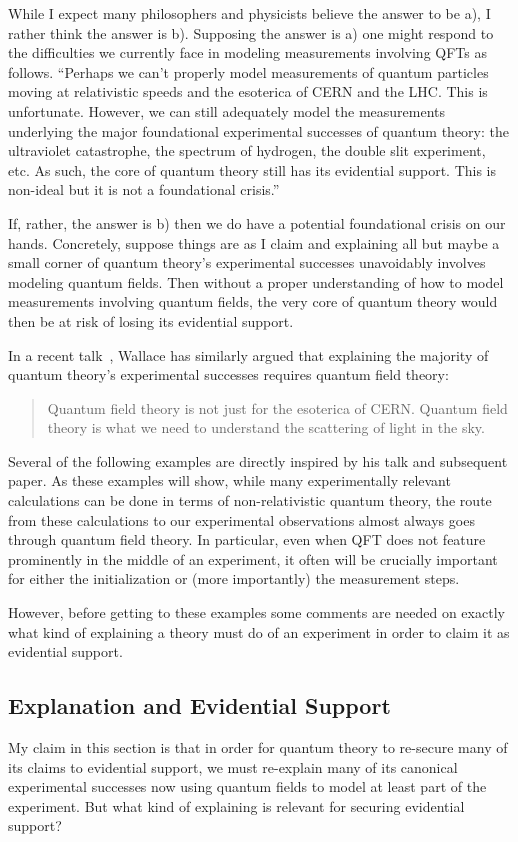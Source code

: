 \documentclass[12pt,prd,superscriptaddress,floatfix,amsmath,amssymb,amsfonts,nofootinbib]{revtex4-2}
\begin{document}
While I expect many philosophers and physicists believe the answer to be a), I rather think the answer is b). Supposing the answer is a) one might respond to the difficulties we currently face in modeling measurements involving QFTs as follows. ``Perhaps we can't properly model measurements of quantum particles moving at relativistic speeds and the esoterica of CERN and the LHC. This is unfortunate. However, we can still adequately model the measurements underlying the major foundational experimental successes of quantum theory: the ultraviolet catastrophe, the spectrum of hydrogen, the double slit experiment, etc. As such, the core of quantum theory still has its evidential support. This is non-ideal but it is not a foundational crisis.'' 

If, rather, the answer is b) then we do have a potential foundational crisis on our hands. Concretely, suppose things are as I claim and explaining all but maybe a small corner of quantum theory's experimental successes unavoidably involves modeling quantum fields. Then without a proper understanding of how to model measurements involving quantum fields, the very core of quantum theory would then be at risk of losing its evidential support.

In a recent talk~\cite{WallaceBlueSkyTalk}, Wallace has similarly argued that explaining the majority of quantum theory's experimental successes requires quantum field theory: 
\begin{quote}
    Quantum field theory is not just for the esoterica of CERN. Quantum field theory is what we need to understand the scattering of light in the sky.
\end{quote}
Several of the following examples are directly inspired by his talk and subsequent paper\cite{WallaceBlueSkyPaper}. As these examples will show, while many experimentally relevant calculations can be done in terms of non-relativistic quantum theory, the route from these calculations to our experimental observations almost always goes through quantum field theory. In particular, even when QFT does not feature prominently in the middle of an experiment, it often will be crucially important for either the initialization or (more importantly) the measurement steps.

However, before getting to these examples some comments are needed on exactly what kind of explaining a theory must do of an experiment in order to claim it as evidential support.

\subsection{Explanation and Evidential Support}\label{Standards}
My claim in this section is that in order for quantum theory to re-secure many of its claims to evidential support, we must re-explain many of its canonical experimental successes now using quantum fields to model at least part of the experiment. But what kind of explaining is relevant for securing evidential support?
\end{document}
